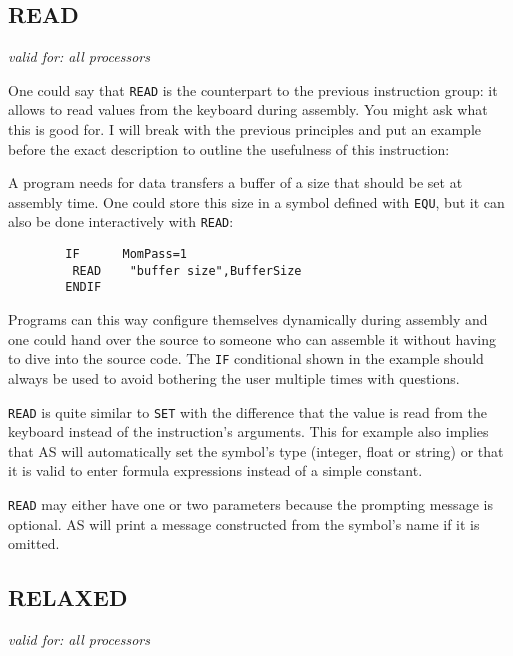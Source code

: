 \documentclass[12pt,twoside]{report}
\makeatletter
\newcommand{\tty}[1]{{\tt #1}}
\newcommand{\ttindex}[1]{\index{#1@{\tt #1}}}
\makeatother
\begin{document}

\subsection{READ}
\ttindex{READ}
           
{\em valid for: all processors}

One could say that \tty{READ} is the counterpart to the previous
instruction group: it allows to read values from the keyboard during
assembly.  You might ask what this is good for.  I will break with
the previous principles and put an example before the exact
description to outline the usefulness of this instruction:

A program needs for data transfers a buffer of a size that should be
set at assembly time.  One could store this size in a symbol defined
with \tty{EQU}, but it can also be done interactively with \tty{READ}:
\begin{verbatim}
        IF      MomPass=1
         READ    "buffer size",BufferSize
        ENDIF
\end{verbatim}
Programs can this way configure themselves dynamically during assembly
and one could hand over the source to someone who can assemble it
without having to dive into the source code.  The \tty{IF} conditional
shown in the example should always be used to avoid bothering the
user multiple times with questions.

\tty{READ} is quite similar to \tty{SET} with the difference that the
value is read from the keyboard instead of the instruction's arguments. 
This for example also implies that AS will automatically set the symbol's
type (integer, float or string) or that it is valid to enter formula
expressions instead of a simple constant.

\tty{READ} may either have one or two parameters because the prompting
message is optional.  AS will print a message constructed from the
symbol's name if it is omitted.


\subsection{RELAXED}
\label{SectRELAXED}
\ttindex{RELAXED}

{\em valid for: all processors}
\end{document}
